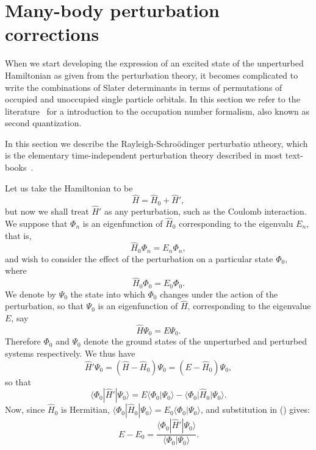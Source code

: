 \section{Many-body perturbation corrections}
\label{sec:MBPT}
When we start developing the expression of an excited state of the unperturbed Hamiltonian as given from the perturbation theory, it becomes complicated to write the combinations of Slater determinants in terms of permutations of occupied and unoccupied single particle orbitals.
In this section we refer to the literature~\cite{heinonen1991,Raimes1972} for a introduction to the occupation number formalism, also known as second quantization.

In this section we describe the Rayleigh-Schro\"odinger perturbatio ntheory, which is the elementary time-independent perturbation theory described in most text-books~\cite{Raimes1972}.

Let us take the Hamiltonian to be
\begin{equation}
\nonumber
\hat{H}=\hat{H}_0+\hat{H}',
\end{equation}
but now we shall treat $\hat{H}'$ as any perturbation, such as the Coulomb interaction. We suppose that $\Phi_n$ is an eigenfunction of $\hat{H}_0$ corresponding to the eigenvalu $E_n$, that is,
\begin{equation}
\nonumber
\hat{H}_0 \Phi_n = E_n \Phi_n,
\end{equation}
and wish to consider the effect of the perturbation on a particular state $\Phi_0,$ where
\begin{equation}
\nonumber
\hat{H}_0 \Phi_0 = E_0 \Phi_0.
\end{equation}
We denote by $\Psi_0$ the state into which $\Phi_0$ changes under the action of the perturbation, so that $\Psi_0$ is an eigenfunction of $\hat{H}$, corresponding to the eigenvalue $E$, say
\begin{equation}
\nonumber
\hat{H} \Psi_0 = E \Psi_0.
\end{equation}
Therefore $\Phi_0$ and $\Psi_0$ denote the ground states of the unperturbed and perturbed systems respectively.
We thus have
\begin{equation}
\hat{H}' \Psi_0 = (\hat{H}-\hat{H}_0) \Psi_0 = (E-\hat{H}_0) \Psi_0,
\end{equation}
so that 
\begin{equation}
\label{eq:160}
\langle \Phi_0 |\hat{H}'| \Psi_0 \rangle= E \langle \Phi_0| \Psi_0 \rangle - \langle \Phi_0 | \hat{H}_0| \Psi_0 \rangle.
\end{equation}
Now, since $\hat{H}_0$ is Hermitian, $ \langle \Phi_0 | \hat{H}_0| \Psi_0 \rangle =  E_0 \langle \Phi_0 |\Psi_0 \rangle$, and substitution in (\label{eq:160})  gives:
\begin{equation}
\label{eq:162}
\nonumber
E-E_0 = \frac{\langle \Phi_0 |\hat{H}'| \Psi_0 \rangle}{\langle \Phi_0 |\Psi_0 \rangle}.
\end{equation}

